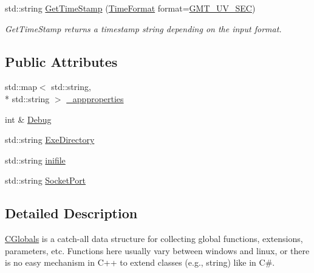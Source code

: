 \begin{DoxyCompactItemize}
std\-::string \hyperlink{classCGlobals_abd6bdad8865f80e6a084c6f02a1cd047}{Get\-Time\-Stamp} (\hyperlink{classCGlobals_a32f8f289bca445b5a2f6d1c68b6cbbb2}{Time\-Format} format=\hyperlink{classCGlobals_a32f8f289bca445b5a2f6d1c68b6cbbb2ab0c064ba74b13a541bb4b8379bca2ae7}{G\-M\-T\-\_\-\-U\-V\-\_\-\-S\-E\-C})
\begin{DoxyCompactList}\small\item\em Get\-Time\-Stamp returns a timestamp string depending on the input format. \end{DoxyCompactList}\end{DoxyCompactItemize}
\subsection*{Public Attributes}
\begin{DoxyCompactItemize}
\item 
std\-::map$<$ std\-::string, \\*
std\-::string $>$ \hyperlink{classCGlobals_a66ffe804a7f6a8d41803482f5dc121e6}{\-\_\-appproperties}
\item 
int \& \hyperlink{classCGlobals_ac0446ab6c8959e553bd9e2cae4e3f5f3}{Debug}
\item 
std\-::string \hyperlink{classCGlobals_a366c33d78a09a99d5eb0e902facf4624}{Exe\-Directory}
\item 
std\-::string \hyperlink{classCGlobals_a5ded9605f21a03f651f6097f1b0ef42c}{inifile}
\item 
std\-::string \hyperlink{classCGlobals_ac1198be99fab95dbe1f2b94891fb0088}{Socket\-Port}
\end{DoxyCompactItemize}


\subsection{Detailed Description}
\hyperlink{classCGlobals}{C\-Globals} is a catch-\/all data structure for collecting global functions, extensions, parameters, etc. Functions here usually vary between windows and linux, or there is no easy mechanism in C++ to extend classes (e.\-g., string) like in C\#. 

